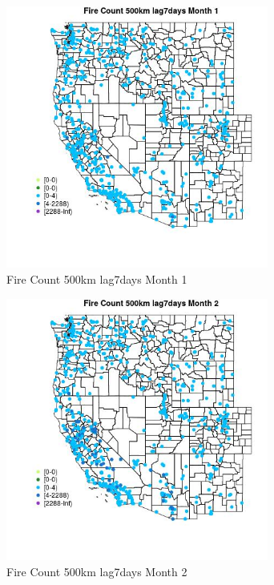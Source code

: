 \begin{figure} 
\centering  
\includegraphics[width=0.77\textwidth]{Code_Outputs/Report_ML_input_PM25_Step4_part_e_de_duplicated_aves_compiled_2019-05-21wNAs_MapObsMo1Fire_Count_500km_lag7days.jpg} 
\caption{\label{fig:Report_ML_input_PM25_Step4_part_e_de_duplicated_aves_compiled_2019-05-21wNAsMapObsMo1Fire_Count_500km_lag7days}Fire Count 500km lag7days Month 1} 
\end{figure} 
 

\begin{figure} 
\centering  
\includegraphics[width=0.77\textwidth]{Code_Outputs/Report_ML_input_PM25_Step4_part_e_de_duplicated_aves_compiled_2019-05-21wNAs_MapObsMo2Fire_Count_500km_lag7days.jpg} 
\caption{\label{fig:Report_ML_input_PM25_Step4_part_e_de_duplicated_aves_compiled_2019-05-21wNAsMapObsMo2Fire_Count_500km_lag7days}Fire Count 500km lag7days Month 2} 
\end{figure} 
 

